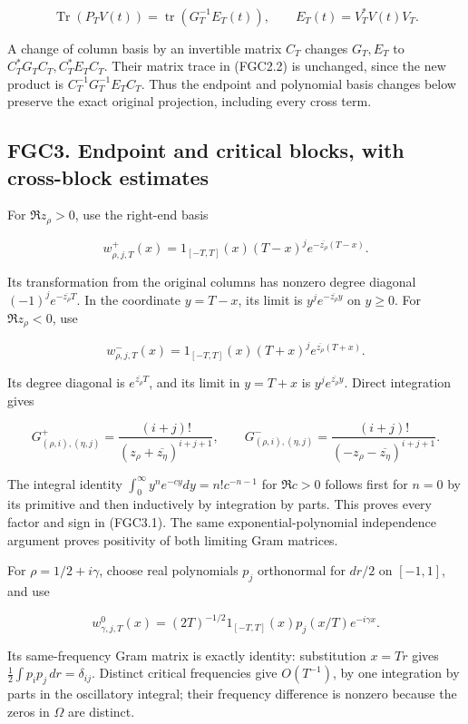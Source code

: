 \[
 \operatorname{Tr}(P_TV(t))
 =\operatorname{tr}(G_T^{-1}E_T(t)),
 \qquad E_T(t)=V_T^*V(t)V_T.
\tag{FGC2.2}
\]

A change of column basis by an invertible matrix \(C_T\) changes
\(G_T,E_T\) to \(C_T^*G_TC_T,C_T^*E_TC_T\). Their matrix trace in
(FGC2.2) is unchanged, since the new product is
\(C_T^{-1}G_T^{-1}E_TC_T\). Thus the endpoint and polynomial basis
changes below preserve the exact original projection, including every
cross term.

\subsection{FGC3. Endpoint and critical blocks, with cross-block
estimates}\label{fgc3.-endpoint-and-critical-blocks-with-cross-block-estimates}

For \(\Re z_\rho>0\), use the right-end basis

\[
 w^+_{\rho,j,T}(x)=1_{[-T,T]}(x)(T-x)^j
 e^{-\overline{z_\rho}(T-x)}.
\]

Its transformation from the original columns has nonzero degree diagonal
\((-1)^j e^{-\overline{z_\rho}T}\). In the coordinate \(y=T-x\), its
limit is \(y^je^{-\overline{z_\rho}y}\) on \(y\geq0\). For
\(\Re z_\rho<0\), use

\[
 w^-_{\rho,j,T}(x)=1_{[-T,T]}(x)(T+x)^j
 e^{\overline{z_\rho}(T+x)}.
\]

Its degree diagonal is \(e^{\overline{z_\rho}T}\), and its limit in
\(y=T+x\) is \(y^je^{\overline{z_\rho}y}\). Direct integration gives

\[
 G^+_{(\rho,i),(\eta,j)}
 =\frac{(i+j)!}{(z_\rho+\overline{z_\eta})^{i+j+1}},\qquad
 G^-_{(\rho,i),(\eta,j)}
 =\frac{(i+j)!}{(-z_\rho-\overline{z_\eta})^{i+j+1}}.
\tag{FGC3.1}
\]

The integral identity \(\int_0^\infty y^n e^{-cy}dy=n!c^{-n-1}\) for
\(\Re c>0\) follows first for \(n=0\) by its primitive and then
inductively by integration by parts. This proves every factor and sign
in (FGC3.1). The same exponential-polynomial independence argument
proves positivity of both limiting Gram matrices.

For \(\rho=1/2+i\gamma\), choose real polynomials \(p_j\) orthonormal
for \(dr/2\) on \([-1,1]\), and use

\[
 w^0_{\gamma,j,T}(x)=(2T)^{-1/2}1_{[-T,T]}(x)
 p_j(x/T)e^{-i\gamma x}.
\tag{FGC3.2}
\]

Its same-frequency Gram matrix is exactly identity: substitution
\(x=Tr\) gives \(\frac12\int p_i p_j\,dr=\delta_{ij}\). Distinct
critical frequencies give \(O(T^{-1})\), by one integration by parts in
the oscillatory integral; their frequency difference is nonzero because
the zeros in \(\Omega\) are distinct.


